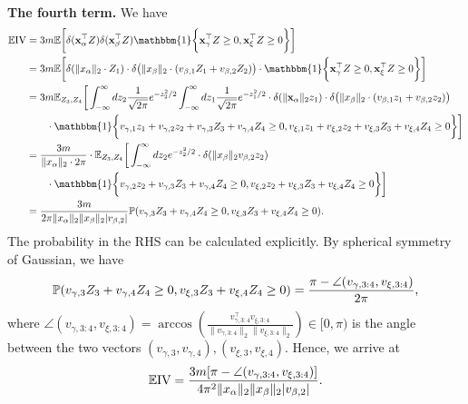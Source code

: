 ~\\

{\bf The fourth term.} We have
\allowdisplaybreaks
\begingroup
\begin{align*}
	\bbE \RN{4} & = 3m  \bbE\bigg[\delta(\rvx_\alpha^\top Z) \delta(\rvx_\beta^\top Z)\mathbbm{1}\bigg\{\rvx_\gamma^\top Z \geq 0,\rvx_\xi^\top Z \geq 0 \bigg\}\bigg] \\
	& = 3m \bbE \bigg[\delta(\|x_\alpha \|_2\cdot Z_1)\cdot \delta\bigl(\|x_\beta \|_2 \cdot (v_{\beta, 1} Z_1 + v_{\beta, 2} Z_2)\bigr) \cdot \mathbbm{1}\bigg\{\rvx_\gamma^\top Z \geq 0,\rvx_\xi^\top Z \geq 0 \bigg\}\bigg] \\
	& = 3m \bbE_{Z_3, Z_4} \bigg[\int_{-\infty}^\infty dz_2 \frac{1}{\sqrt{2\pi}}e^{-z_2^2/2} \int_{-\infty}^\infty dz_1 \frac{1}{\sqrt{2\pi}}e^{-z_1^2/2} \cdot \delta(\|\rvx_\alpha\|_2 z_1)\cdot \delta\bigl(\|x_\beta \|_2 \cdot (v_{\beta, 1} z_1 + v_{\beta, 2} z_2)\bigr) \\
	& \qquad \cdot \mathbbm{1}\bigg\{ v_{\gamma, 1} z_1 + v_{\gamma, 2} z_2 + v_{\gamma, 3} Z_3 + v_{\gamma, 4} Z_4\geq 0, v_{\xi, 1} z_1 + v_{\xi, 2} z_2 + v_{\xi, 3} Z_3 + v_{\xi, 4} Z_4\geq 0 \bigg\} \bigg]  \\
	& = \frac{3m}{\|x_\alpha\|_2\cdot 2\pi} \cdot \bbE_{Z_3, Z_4}  \bigg[\int_{-\infty}^\infty dz_2 e^{-z_2^2/2} \cdot \delta(\|x_\beta\|_2 v_{\beta, 2} z_2) \\
	& \qquad \cdot  \mathbbm{1}\bigg\{  v_{\gamma, 2} z_2 + v_{\gamma, 3} Z_3 + v_{\gamma, 4} Z_4\geq 0,  v_{\xi, 2} z_2 + v_{\xi, 3} Z_3 + v_{\xi, 4} Z_4\geq 0 \bigg\} \bigg] \\
	& = \frac{3m}{2\pi \|x_\alpha \|_2\|x_\beta\|_2|v_{\beta, 2}|}  \bbP(v_{\gamma, 3}Z_3 + v_{\gamma, 4}Z_4 \geq 0, v_{\xi, 3}Z_3 + v_{\xi, 4} Z_4 \geq 0).
\end{align*}	
\endgroup
The probability in the RHS can be calculated explicitly. By spherical symmetry of Gaussian, we have
\[
	{\mathbb{P}}(v_{\gamma, 3}Z_3 + v_{\gamma, 4}Z_4 \geq 0, v_{\xi, 3}Z_3 + v_{\xi, 4} Z_4 \geq 0) = \frac{\pi - \angle(v_{\gamma, 3:4}, v_{\xi, 3:4})}{2\pi},
\]
where $\angle(v_{\gamma, 3:4}, v_{\xi, 3:4}) = \arccos(\frac{v_{\gamma, 3:4}^\top v_{\xi, 3:4}}{\|v_{\gamma, 3:4} \|_2\|v_{\xi, 3:4}\|_2})\in [0, \pi)$ is the angle between the two vectors $(v_{\gamma , 3}, v_{\gamma, 4}), (v_{\xi, 3}, v_{\xi ,4})$. Hence, we arrive at
\[
	\bbE \RN{4} =  \frac{3m [\pi - \angle(v_{\gamma, 3:4}, v_{\xi, 3:4})]}{4\pi^2 \|x_\alpha \|_2\|x_\beta\|_2|v_{\beta, 2}|}.
\]
~\\

